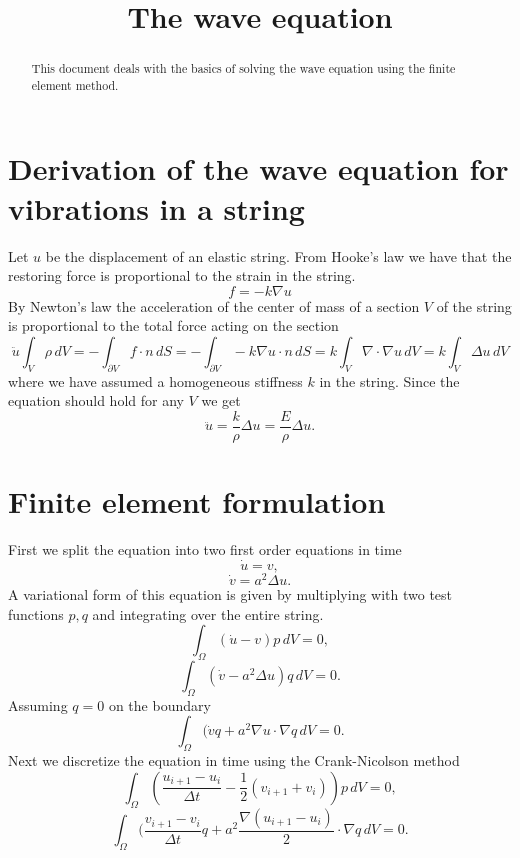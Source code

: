 \documentclass[a4paper,10pt]{article}
\begin{document}
\title{The wave equation}
\maketitle

\begin{abstract}
\noindent
This document deals with the basics of solving the wave equation using the
finite element method.
\end{abstract}

\section{Derivation of the wave equation for vibrations in a string}
Let $u$ be the displacement of an elastic string. From Hooke's law we have that
the restoring force is proportional to the strain in the string.
\[
f = -k \nabla u
\]
By Newton's law the acceleration of the center of mass of a section $V$ of the
string is proportional to the total force acting on the section
\[
\ddot{u} \int_V \rho \, dV = - \int_{\partial V} f \cdot n \, dS
= - \int_{\partial V} -k \nabla u \cdot n \, dS
= k \int_{V} \nabla \cdot \nabla u \, dV
= k \int_V \Delta u \, dV
\]
where we have assumed a homogeneous stiffness $k$ in the string. Since the
equation should hold for any $V$ we get
\[
\ddot{u} = \frac{k}{\rho} \Delta u = \frac{E}{\rho} \Delta u.
\]

\section{Finite element formulation}
First we split the equation into two first order equations in time
\[
\dot{u} = v,
\]
\[
\dot{v} = a^2 \Delta u.
\]
A variational form of this equation is given by multiplying with two test
functions $p, q$ and integrating over the entire string.
\[
\int_{\Omega} (\dot{u} - v) p \, dV = 0,
\]
\[
\int_{\Omega} (\dot{v} - a^2 \Delta u) q \, dV = 0.
\]
Assuming $q = 0$ on the boundary
\[
\int_{\Omega} (\dot{v} q + a^2 \nabla u \cdot \nabla q \, dV = 0.
\]
Next we discretize the equation in time using the Crank-Nicolson method
\[
\int_{\Omega} (\frac{u_{i + 1} - u_i}{\Delta t} - \frac{1}{2} \left( v_{i + 1} + v_i \right)) p \, dV = 0,
\]
\[
\int_{\Omega} (\frac{v_{i + 1} - v_i}{\Delta t} q + a^2 \frac{\nabla (u_{i + 1} - u_i)}{2} \cdot \nabla q \, dV = 0.
\]
\end{document}
